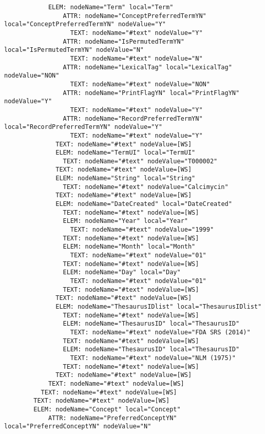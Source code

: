 \documentclass[11pt,english]{article}
\begin{document}
\begin{enumerate}
\begin{lstlisting}
            ELEM: nodeName="Term" local="Term"
                ATTR: nodeName="ConceptPreferredTermYN" local="ConceptPreferredTermYN" nodeValue="Y"
                  TEXT: nodeName="#text" nodeValue="Y"
                ATTR: nodeName="IsPermutedTermYN" local="IsPermutedTermYN" nodeValue="N"
                  TEXT: nodeName="#text" nodeValue="N"
                ATTR: nodeName="LexicalTag" local="LexicalTag" nodeValue="NON"
                  TEXT: nodeName="#text" nodeValue="NON"
                ATTR: nodeName="PrintFlagYN" local="PrintFlagYN" nodeValue="Y"
                  TEXT: nodeName="#text" nodeValue="Y"
                ATTR: nodeName="RecordPreferredTermYN" local="RecordPreferredTermYN" nodeValue="Y"
                  TEXT: nodeName="#text" nodeValue="Y"
              TEXT: nodeName="#text" nodeValue=[WS]
              ELEM: nodeName="TermUI" local="TermUI"
                TEXT: nodeName="#text" nodeValue="T000002"
              TEXT: nodeName="#text" nodeValue=[WS]
              ELEM: nodeName="String" local="String"
                TEXT: nodeName="#text" nodeValue="Calcimycin"
              TEXT: nodeName="#text" nodeValue=[WS]
              ELEM: nodeName="DateCreated" local="DateCreated"
                TEXT: nodeName="#text" nodeValue=[WS]
                ELEM: nodeName="Year" local="Year"
                  TEXT: nodeName="#text" nodeValue="1999"
                TEXT: nodeName="#text" nodeValue=[WS]
                ELEM: nodeName="Month" local="Month"
                  TEXT: nodeName="#text" nodeValue="01"
                TEXT: nodeName="#text" nodeValue=[WS]
                ELEM: nodeName="Day" local="Day"
                  TEXT: nodeName="#text" nodeValue="01"
                TEXT: nodeName="#text" nodeValue=[WS]
              TEXT: nodeName="#text" nodeValue=[WS]
              ELEM: nodeName="ThesaurusIDlist" local="ThesaurusIDlist"
                TEXT: nodeName="#text" nodeValue=[WS]
                ELEM: nodeName="ThesaurusID" local="ThesaurusID"
                  TEXT: nodeName="#text" nodeValue="FDA SRS (2014)"
                TEXT: nodeName="#text" nodeValue=[WS]
                ELEM: nodeName="ThesaurusID" local="ThesaurusID"
                  TEXT: nodeName="#text" nodeValue="NLM (1975)"
                TEXT: nodeName="#text" nodeValue=[WS]
              TEXT: nodeName="#text" nodeValue=[WS]
            TEXT: nodeName="#text" nodeValue=[WS]
          TEXT: nodeName="#text" nodeValue=[WS]
        TEXT: nodeName="#text" nodeValue=[WS]
        ELEM: nodeName="Concept" local="Concept"
            ATTR: nodeName="PreferredConceptYN" local="PreferredConceptYN" nodeValue="N"

\end{lstlisting}
\end{enumerate}
\end{document}
